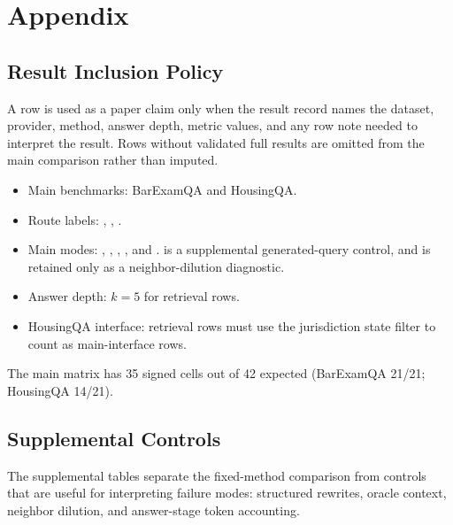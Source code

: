 \section{Appendix}\label{sec:appendix}

\subsection{Result Inclusion Policy}\label{sec:appendix:policy}

A row is used as a paper claim only when the result record names the dataset,
provider, method, answer depth, metric values, and any row note needed to
interpret the result. Rows without validated full results are omitted from the
main comparison rather than imputed.

\begin{itemize}[leftmargin=*]
\item Main benchmarks: BarExamQA and HousingQA.
\item Route labels: , ,
.
\item Main modes: , ,
, , and .
 is a supplemental generated-query control, and
 is retained only as a neighbor-dilution
diagnostic.
\item Answer depth: $k=5$ for retrieval rows.
\item HousingQA interface: retrieval rows must use the jurisdiction state
filter to count as main-interface rows.
\end{itemize}

The main matrix has 35 signed cells out of 42 expected (BarExamQA 21/21; HousingQA 14/21).

\FloatBarrier

\subsection{Supplemental Controls}\label{sec:appendix:additional}

The supplemental tables separate the fixed-method comparison from controls that
are useful for interpreting failure modes: structured rewrites, oracle context,
neighbor dilution, and answer-stage token accounting.







